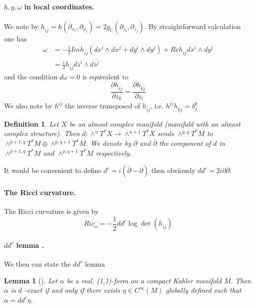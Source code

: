 \documentclass[11pt]{article}
\newtheorem{lemma}[theorem]{Lemma}
\newtheorem{definition}{Definition}
\begin{document}
\paragraph*{\(h,g,\omega\) in local coordinates.}
\label{sec:orgcc64495}
We note by \(h_{i\bar j} = h(\partial_{x_i},\partial_{x_j}) =
2g_{\mathbb{C}}(\partial_{z_i},\partial_{z_j})\). By straightforward calculation one has
\begin{align*}
\omega & = -\frac{1}{2} Im h_{i\bar j} (dx^i\wedge dx^j + dy^i\wedge dy^j) + Re h_{i\bar j}dx^i\wedge dy^j\\
& = \frac{i}{2}h_{i\bar j}dz^i\wedge d\bar{z^j}
\end{align*}
and the condition \(d\omega = 0\) is equivalent to
\[
\frac{\partial h_{i\bar j}}{\partial z_k} = \frac{\partial h_{k\bar j}}{\partial z_i}
\]
We also note by \(h^{i\bar j}\) the inverse transposed of \(h_{i\bar j}\), i.e. \(h^{i\bar j}h_{k\bar j}
= \delta_j^k\)
\begin{definition}
Let \(X\) be an almost complex manifold (manifold with an almost complex structure). Then
\(d:\wedge^nT^*X\longrightarrow \wedge^{n+1}T^*X\) sends \(\wedge^{p,q}T^*M\) to
\(\wedge^{p+1,q}T^*M\oplus \wedge^{p,q+1}T^*M\). We denote by \(\partial\) and \(\bar\partial\) the
component of \(d\) in \(\wedge^{p+1,q}T^*M\) and \(\wedge^{p,q+1}T^*M\) respectively. 
\end{definition}
It would be convenient to define \(d^c =i(\bar\partial - \partial)\) then obviously \(dd^c =
2i\partial\bar\partial\). 


\paragraph*{The Ricci curvature.}
\label{sec:org2f75800}
The Ricci curvature is given by
\[
Ric_{\omega} = -\frac{1}{2}dd^c\log\det(h_{i\bar j})
\]


\paragraph*{\(dd^c\) lemma .}
\label{sec:orgd5f9686}
We then can state the \(dd^c\) lemma
\begin{lemma}[]
Let \(\alpha\) be a real, (1,1)-form on a compact Kahler manifold \(M\). Then \(\alpha\) is \(d\) -exact if
and only if there exists \(\eta\in C^\infty(M)\) globally defined such that \(\alpha = dd^c\eta\).
\end{lemma}
\end{document}
